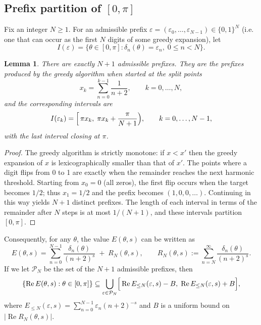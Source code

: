 \documentclass[11pt,a4paper]{article}
\newtheorem{lemma}[theorem]{Lemma}
\theoremstyle{definition}
\theoremstyle{remark}
\begin{document}
\subsection{Prefix partition of \([0,\pi]\)}
Fix an integer \(N\ge 1\).  For an admissible prefix \(\varepsilon = (\varepsilon_0,\dots,\varepsilon_{N-1})\in\{0,1\}^N\) (i.e. one that can occur as the first \(N\) digits of some greedy expansion), let
\[
I(\varepsilon) = \{\theta\in[0,\pi]: \delta_n(\theta)=\varepsilon_n,\; 0\le n < N\}.
\]

\begin{lemma}\label{lem:partition}
There are exactly \(N+1\) admissible prefixes.  They are the prefixes produced by the greedy algorithm when started at the split points
\[
x_k = \sum_{n=0}^{k-1}\frac{1}{n+2},\qquad k=0,\dots,N,
\]
and the corresponding intervals are
\[
I(\varepsilon_k) = \Bigl[\,\pi x_k,\; \pi x_k + \frac{\pi}{N+1}\Bigr),\qquad k=0,\dots,N-1,
\]
with the last interval closing at \(\pi\).
\end{lemma}
\begin{proof}
The greedy algorithm is strictly monotone: if \(x<x'\) then the greedy expansion of \(x\) is lexicographically smaller than that of \(x'\).  The points where a digit flips from 0 to 1 are exactly when the remainder reaches the next harmonic threshold.  Starting from \(x_0=0\) (all zeros), the first flip occurs when the target becomes \(1/2\); thus \(x_1=1/2\) and the prefix becomes \((1,0,0,\dots)\).  Continuing in this way yields \(N+1\) distinct prefixes.  The length of each interval in terms of the remainder after \(N\) steps is at most \(1/(N+1)\), and these intervals partition \([0,\pi]\).
\end{proof}

Consequently, for any \(\theta\), the value \(E(\theta,s)\) can be written as
\[
E(\theta,s) = \sum_{n=0}^{N-1}\frac{\delta_n(\theta)}{(n+2)^s} \;+\; R_N(\theta,s),\qquad 
R_N(\theta,s) := \sum_{n=N}^{\infty}\frac{\delta_n(\theta)}{(n+2)^s}.
\tag{6}
\]
If we let \(\mathcal{P}_N\) be the set of the \(N+1\) admissible prefixes, then
\[
\{\operatorname{Re}E(\theta,s):\theta\in[0,\pi]\} \subseteq
\bigcup_{\varepsilon\in\mathcal{P}_N} \Bigl[\,\operatorname{Re}E_{\le N}(\varepsilon,s) - B,\; \operatorname{Re}E_{\le N}(\varepsilon,s) + B\Bigr],
\]
where \(E_{\le N}(\varepsilon,s)=\sum_{n=0}^{N-1}\varepsilon_n (n+2)^{-s}\) and \(B\) is a uniform bound on \(|\operatorname{Re}R_N(\theta,s)|\).
\end{document}
